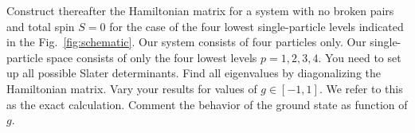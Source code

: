 Construct thereafter the Hamiltonian matrix for a system with no broken pairs and total spin $S = 0$ for the case of the four lowest single-particle levels indicated in the Fig.~\ref{fig:schematic}.
Our system consists of four particles only.
Our single-particle space consists of only the four lowest levels $p= 1, 2, 3, 4$.
You need to set up all possible Slater determinants.
Find all eigenvalues by diagonalizing the Hamiltonian matrix.
Vary your results for values of $g \in [-1, 1]$.
We refer to this as the exact calculation.
Comment the behavior of the ground state as function of $g$.

\subsection{}
\begin{figure}[htbp]
    \centering
\end{figure}
